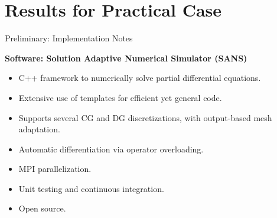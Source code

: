 \documentclass{beamer}
\newcounter{sectionframes}
\newcommand{\setsectionframes}[1]{%
  \setcounter{sectionframes}{#1}%
}
\newcounter{sectionframecount}
\begin{document}
\begin{frame}[plain, t]

\end{frame}

\section{Results for Practical Case}

\setsectionframes{10}


\begin{frame}[t]{Preliminary: Implementation Notes}

\textbf{Software: Solution Adaptive Numerical Simulator (SANS)\footnotemark}
\begin{itemize}
  \item C++ framework to numerically solve partial differential equations.
  \item Extensive use of templates for efficient yet general code.
  \item Supports several CG and DG discretizations, with output-based mesh adaptation.
  \item Automatic differentiation via operator overloading.
  \item MPI parallelization.
  \item Unit testing and continuous integration.
  \item Open source.
\end{itemize}


\end{frame}
\end{document}
